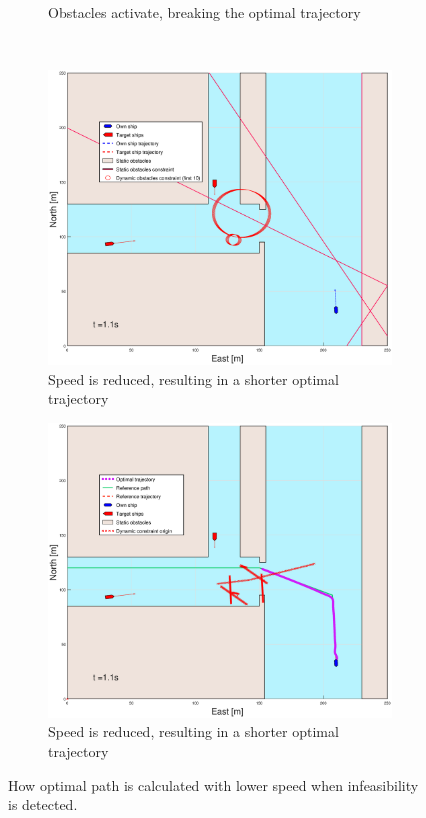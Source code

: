 \begin{figure}[b]
\begin{subfigure}{0.499\textwidth}
        \caption{Obstacles activate, breaking the optimal trajectory}
    \end{subfigure}
    \hfill
    \\
    \begin{subfigure}{0.49\textwidth}
        \centering
        \includegraphics[width=\textwidth]{Images/Figures/Extra_Stuff/BlockedPath_Pos_t=3}
        \caption{Speed is reduced, resulting in a shorter optimal trajectory}
    \end{subfigure}
    \begin{subfigure}{0.499\textwidth}
        \centering
        \includegraphics[width=\textwidth]{Images/Figures/Extra_Stuff/BlockedPath_Wopt_t=3}
        \caption{Speed is reduced, resulting in a shorter optimal trajectory}
    \end{subfigure}
    \hfill
    \caption{How optimal path is calculated with lower speed when infeasibility is detected.}
\end{figure}

